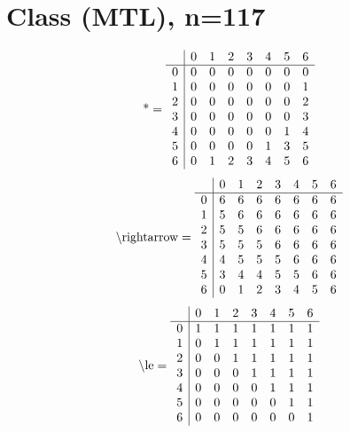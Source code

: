 \documentclass[11pt]{article}
\begin{document}
\section{Class (MTL), n=117}
\[\text{*} = 
\begin{array}{r | r r r r r r r}
 & 0 & 1 & 2 & 3 & 4 & 5 & 6 \\ \hline
0 & 0 & 0 & 0 & 0 & 0 & 0 & 0 \\
1 & 0 & 0 & 0 & 0 & 0 & 0 & 1 \\
2 & 0 & 0 & 0 & 0 & 0 & 0 & 2 \\
3 & 0 & 0 & 0 & 0 & 0 & 0 & 3 \\
4 & 0 & 0 & 0 & 0 & 0 & 1 & 4 \\
5 & 0 & 0 & 0 & 0 & 1 & 3 & 5 \\
6 & 0 & 1 & 2 & 3 & 4 & 5 & 6 \\
\end{array}
\]
\[\text{\textbackslash rightarrow} = 
\begin{array}{r | r r r r r r r}
 & 0 & 1 & 2 & 3 & 4 & 5 & 6 \\ \hline
0 & 6 & 6 & 6 & 6 & 6 & 6 & 6 \\
1 & 5 & 6 & 6 & 6 & 6 & 6 & 6 \\
2 & 5 & 5 & 6 & 6 & 6 & 6 & 6 \\
3 & 5 & 5 & 5 & 6 & 6 & 6 & 6 \\
4 & 4 & 5 & 5 & 5 & 6 & 6 & 6 \\
5 & 3 & 4 & 4 & 5 & 5 & 6 & 6 \\
6 & 0 & 1 & 2 & 3 & 4 & 5 & 6 \\
\end{array}
\]
\[\text{\textbackslash le} = 
\begin{array}{r | r r r r r r r}
 & 0 & 1 & 2 & 3 & 4 & 5 & 6 \\ \hline
0 & 1 & 1 & 1 & 1 & 1 & 1 & 1 \\
1 & 0 & 1 & 1 & 1 & 1 & 1 & 1 \\
2 & 0 & 0 & 1 & 1 & 1 & 1 & 1 \\
3 & 0 & 0 & 0 & 1 & 1 & 1 & 1 \\
4 & 0 & 0 & 0 & 0 & 1 & 1 & 1 \\
5 & 0 & 0 & 0 & 0 & 0 & 1 & 1 \\
6 & 0 & 0 & 0 & 0 & 0 & 0 & 1 \\
\end{array}
\]
\end{document}
